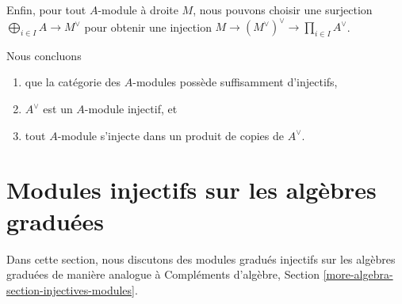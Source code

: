 \medskip\noindent
Enfin, pour tout $A$-module à droite $M$, nous pouvons choisir une surjection
$\bigoplus_{i \in I} A \to M^\vee$ pour obtenir une injection $M \to (M^\vee)^\vee
\to \prod_{i \in I} A^\vee$.

\medskip\noindent
Nous concluons
\begin{enumerate}
\item que la catégorie des $A$-modules possède suffisamment d'injectifs,
\item $A^\vee$ est un $A$-module injectif, et
\item tout $A$-module s'injecte dans un produit de copies de $A^\vee$.
\end{enumerate}





\section{Modules injectifs sur les algèbres graduées}
\label{section-modules-noncommutative-graded}

\noindent
Dans cette section, nous discutons des modules gradués injectifs sur les algèbres
graduées de manière analogue à Compléments d'algèbre, Section
\ref{more-algebra-section-injectives-modules}.

